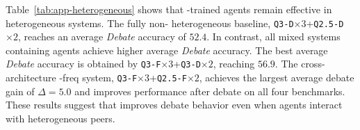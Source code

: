 Table~\ref{tab:app-heterogeneous} shows that \SDRL{}-trained agents remain effective in heterogeneous systems. The fully non-\SDRL{} heterogeneous baseline, \texttt{Q3-D}$\times3$+\texttt{Q2.5-D}$\times2$, reaches an average \textit{Debate} accuracy of $52.4$. In contrast, all mixed systems containing \SDRL{} agents achieve higher average \textit{Debate} accuracy. The best average \textit{Debate} accuracy is obtained by \texttt{Q3-F}$\times3$+\texttt{Q3-D}$\times2$, reaching $56.9$. The cross-architecture \SDRL{}-freq system, \texttt{Q3-F}$\times3$+\texttt{Q2.5-F}$\times2$, achieves the largest average debate gain of $\Delta=5.0$ and improves performance after debate on all four benchmarks. These results suggest that \SDRL{} improves debate behavior even when agents interact with heterogeneous peers.

\begin{table}[t]
  \caption{Heterogeneous multi-agent debate results. Each system contains $5$ agents with different model architectures or training variants. \textit{Maj} denotes majority-vote accuracy before debate, \textit{Debate} denotes accuracy after one debate round, and $\Delta$ denotes their difference. Best \textit{Debate} results are bolded within each benchmark.}
  \label{tab:app-heterogeneous}
  \begin{center}
\end{center}
\end{table}
